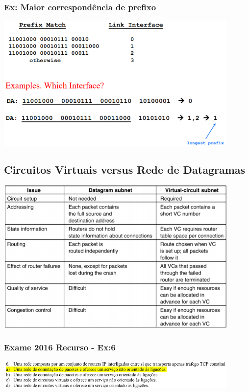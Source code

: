 \documentclass[../resumosRCOM.tex]{subfiles}
\begin{document}
\subsubsection{Ex: Maior correspondência de prefixo}
\begin{center}            
    \includegraphics[width=12cm]{images/RCOM4.png}
\end{center}

\subsection{Circuitos Virtuais versus Rede de Datagramas}
\begin{center}            
    \includegraphics[width=12cm]{images/RCOM5.png}
\end{center}

\subsubsection{Exame 2016 Recurso - Ex:6}
\begin{center}            
    \includegraphics[width=12cm]{images/RCOM48.png}
\end{center}
\end{document}
